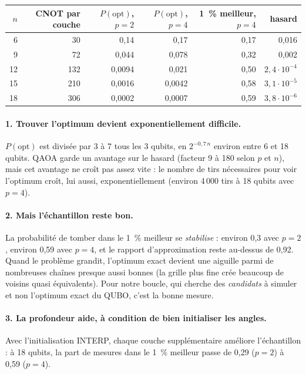 \begin{center}
\begin{tabular}{rrrrrr}
\toprule
$n$ & CNOT par couche & $P(\text{opt})$, $p=2$ & $P(\text{opt})$, $p=4$ & 1~\% meilleur, $p=4$ & hasard \\
\midrule
6 & 30 & 0,14 & 0,17 & 0,17 & 0,016 \\
9 & 72 & 0,044 & 0,078 & 0,32 & 0,002 \\
12 & 132 & 0,0094 & 0,021 & 0,50 & $2{,}4\cdot10^{-4}$ \\
15 & 210 & 0,0016 & 0,0042 & 0,58 & $3{,}1\cdot10^{-5}$ \\
18 & 306 & 0,0002 & 0,0007 & 0,59 & $3{,}8\cdot10^{-6}$ \\
\bottomrule
\end{tabular}
\end{center}

\paragraph{1. Trouver l'optimum devient exponentiellement difficile.} $P(\text{opt})$ est divisée par 3 à 7 tous les 3 qubits, en $2^{-0{,}7\,n}$ environ entre 6 et 18 qubits. QAOA garde un avantage sur le hasard (facteur 9 à 180 selon $p$ et $n$), mais cet avantage ne croît pas assez vite : le nombre de tirs nécessaires pour voir l'optimum croît, lui aussi, exponentiellement (environ 4\,000 tirs à 18 qubits avec $p=4$).

\paragraph{2. Mais l'échantillon reste bon.} La probabilité de tomber dans le 1~\% meilleur se \emph{stabilise} : environ 0,3 avec $p=2$, environ 0,59 avec $p=4$, et le rapport d'approximation reste au-dessus de 0,92. Quand le problème grandit, l'optimum exact devient une aiguille parmi de nombreuses chaînes presque aussi bonnes (la grille plus fine crée beaucoup de voisins quasi équivalents). Pour notre boucle, qui cherche des \emph{candidats} à simuler et non l'optimum exact du QUBO, c'est la bonne mesure.

\paragraph{3. La profondeur aide, à condition de bien initialiser les angles.} Avec l'initialisation INTERP, chaque couche supplémentaire améliore l'échantillon : à 18 qubits, la part de mesures dans le 1~\% meilleur passe de 0,29 ($p=2$) à 0,59 ($p=4$).

